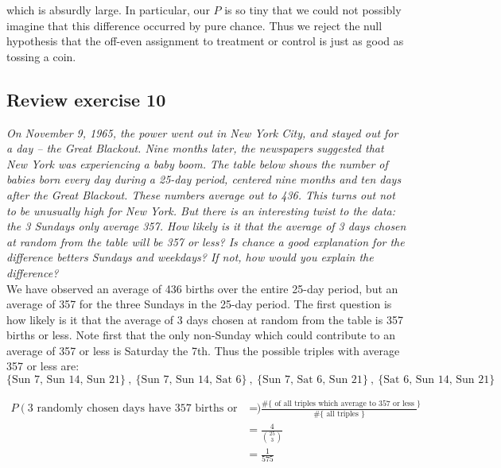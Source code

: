 \documentclass[11pt]{article}
\begin{document}
\noindent which is absurdly large. In particular, our $P$ is so tiny that we could not possibly imagine that this difference occurred by pure chance. Thus we reject the null hypothesis that the off-even assignment to treatment or control is just as good as tossing a coin.


\subsection*{Review exercise 10} %
\noindent \emph{On November 9, 1965, the power went out in New York City, and stayed out for a day -- the Great Blackout. Nine months later, the newspapers suggested that New York was experiencing a baby boom. The table below shows the number of babies born every day during a 25-day period, centered nine months and ten days after the Great Blackout. These numbers average out to 436. This turns out not to be unusually high for New York. But there is an interesting twist to the data: the 3 Sundays only average 357. How likely is it that the average of 3 days chosen at random from the table will be 357 or less? Is chance a good explanation for the difference betters Sundays and weekdays? If not, how would you explain the difference?}\\

\noindent We have observed an average of 436 births over the entire 25-day period, but an average of 357 for the three Sundays in the 25-day period. The first question is how likely is it that the average of 3 days chosen at random from the table is 357 births or less. Note first that the only non-Sunday which could contribute to an average of 357 or less is Saturday the 7th. Thus the possible triples with average 357 or less are:
$$\{\text{Sun 7, Sun 14, Sun 21}\}~,~ \{\text{Sun 7, Sun 14, Sat 6}\}~,~ \{\text{Sun 7, Sat 6, Sun 21}\}~,~ \{\text{Sat 6, Sun 14, Sun 21}\}$$

\begin{align*}
P(\text{3 randomly chosen days have 357 births or less}) &= \frac{\# \{\text{ of all triples which average to 357 or less }\}}{\# \{\text{ all triples }\}}\\
& = \frac{4}{\binom{25}{3}}\\
& = \frac{1}{575}
\end{align*}
\end{document}
